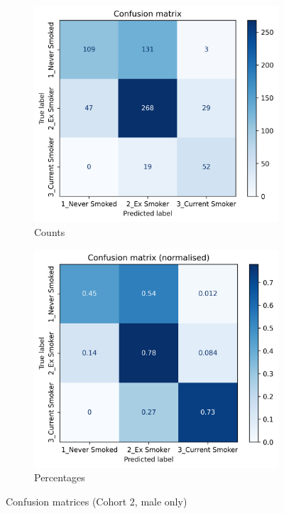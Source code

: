 \documentclass{article} %
\begin{document}
\begin{figure}[p]
    \centering
    \begin{subfigure}{0.45\linewidth}
        \centering
        \includegraphics[width=\linewidth]{cohort2/male_only/test_confusion_matrix.png}
        \caption{Counts}
    \end{subfigure}
    \hspace{4mm}
    \begin{subfigure}{0.45\linewidth}
        \centering
        \includegraphics[width=\linewidth]{cohort2/male_only/test_confusion_matrix_normalised.png}
        \caption{Percentages}
    \end{subfigure}
    \caption[Confusion matrices (Cohort 2, male only)]{Confusion matrices (Cohort 2, male only)}
    \label{fig:male-only-confusion-matrix}
\end{figure}
\end{document}
